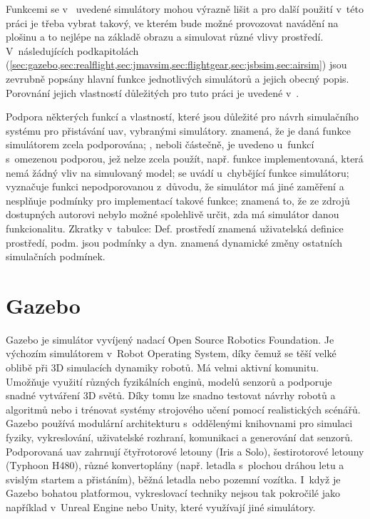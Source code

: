     Funkcemi se v~ uvedené simulátory mohou výrazně lišit a pro další použití v~této práci je třeba vybrat takový, ve kterém bude možné provozovat navádění na plošinu a to nejlépe na základě obrazu a simulovat různé vlivy prostředí. V~následujících podkapitolách (\cref{sec:gazebo,sec:realflight,sec:jmavsim,sec:flightgear,sec:jsbsim,sec:airsim}) jsou zevrubně popsány hlavní funkce jednotlivých simulátorů a jejich obecný popis. 
    Porovnání jejich vlastností důležitých pro tuto práci je uvedené v~.

    \begin{table}
        \centering
        
        \caption[Vlastnosti vybraných simulátorů]{Podpora některých funkcí a vlastností, které jsou důležité pro návrh simulačního systému pro přistávání \acrshort{uav}, vybranými simulátory.  znamená, že je daná funkce simulátorem zcela podporována; , neboli částečně, je uvedeno u~funkcí s~omezenou podporou, jež nelze zcela použít, např. funkce implementovaná, která nemá žádný vliv na simulovaný model;  se uvádí u~chybějící funkce simulátoru; \uv{-} vyznačuje funkci nepodporovanou z~důvodu, že simulátor má jiné zaměření a nesplňuje podmínky pro implementací takové funkce;  znamená to, že ze zdrojů dostupných autorovi nebylo možné spolehlivě určit, zda má simulátor danou funkcionalitu. Zkratky v~tabulce: Def. prostředí znamená uživatelská definice prostředí, podm. jsou podmínky a dyn. znamená dynamické změny ostatních simulačních podmínek.}
        \label{tab:simsfeatures}
    \end{table}

    \section{Gazebo} \label{sec:gazebo}
        Gazebo je simulátor vyvíjený nadací Open Source Robotics Foundation. Je výchozím simulátorem v~Robot Operating System, díky čemuž se těší velké oblibě při 3D simulacích dynamiky robotů. Má velmi aktivní komunitu. Umožňuje využití různých fyzikálních enginů, modelů senzorů a podporuje snadné vytváření 3D světů. Díky tomu lze snadno testovat návrhy robotů a algoritmů nebo i trénovat systémy strojového učení pomocí realistických scénářů. Gazebo používá modulární architekturu s~oddělenými knihovnami pro simulaci fyziky, vykreslování, uživatelské rozhraní, komunikaci a generování dat senzorů. Podporovaná \acrshort{uav} zahrnují čtyřrotorové letouny (Iris a Solo), šestirotorové letouny (Typhoon H480), různé konvertoplány (např. letadla s~plochou dráhou letu a svislým startem a přistáním), běžná letadla nebo pozemní vozítka. I~když je Gazebo bohatou platformou, vykreslovací techniky nejsou tak pokročilé jako například v~Unreal Engine nebo Unity, které využívají jiné simulátory. \cite{Ebeid2018}
    
